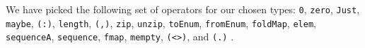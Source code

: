 \documentclass{article} %
\begin{document}
We have picked the following set of operators for our chosen types:
\verb|0|, %
\verb|zero|, %
\verb|Just|, %
\verb|maybe|, %
\verb|(:)|, %
\verb|length|, %
\verb|(,)|, %
\verb|zip|, %
\verb|unzip|, %
\verb|toEnum|, %
\verb|fromEnum|, %
\verb|foldMap|, %
\verb|elem|, %
\verb|sequenceA|, %
\verb|sequence|, %
\verb|fmap|, %
\verb|mempty|, %
\verb|(<>)|, %
and \verb|(.)|%
. %
\end{document}
